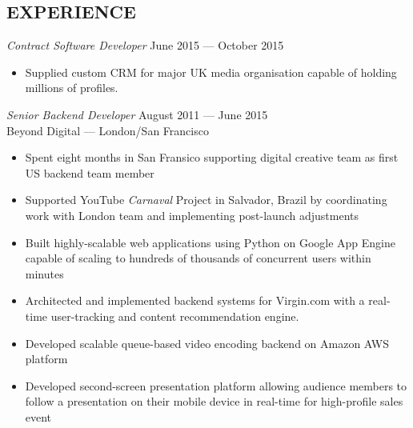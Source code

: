 \documentclass[margin, 10pt]{res} %
\begin{document}
\begin{resume}
\section{EXPERIENCE}

{\sl Contract Software Developer} \hfill June 2015 --- October 2015 \\

\begin{itemize} \itemsep -2pt
\item Supplied custom CRM for major UK media organisation capable of holding
millions of profiles.
\end{itemize}

{\sl Senior Backend Developer} \hfill August 2011 --- June 2015 \\
Beyond Digital --- London/San Francisco \\

\begin{itemize} \itemsep -2pt %
\item Spent eight months in San Fransico supporting digital creative team as first US backend team member
\item Supported YouTube \textit{Carnaval} Project in Salvador, Brazil by coordinating work with London team and implementing post-launch adjustments
\item Built highly-scalable web applications using Python on Google App Engine capable of scaling
to hundreds of thousands of concurrent users within minutes
\item Architected and implemented backend systems for Virgin.com with a real-time user-tracking and content recommendation engine.
\item Developed scalable queue-based video encoding backend on Amazon AWS platform
\item Developed second-screen presentation platform allowing audience members to follow a presentation on their mobile device in real-time for high-profile sales event
\end{itemize}


\end{resume}
\end{document}
